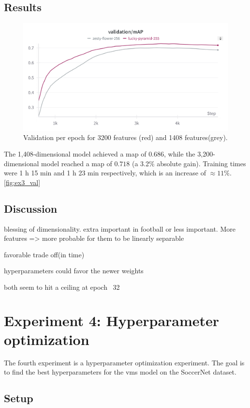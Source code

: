 \subsection{Results}
\label{ssec:ex3_results}

\begin{figure}
    \centering
    \includegraphics[width=0.75\linewidth]{figures/1408_3200_val.png}
    \caption{Validation per epoch for 3200 features (red) and 1408 features(grey). }
    \label{fig:ex3_val}
\end{figure}
The 1,408-dimensional model achieved a  \acrshort{map} of \(0.686\), while the 3,200-dimensional model reached a \acrshort{map} of \(0.718\) (a 3.2\% absolute gain). Training times were 1 h 15 min and 1 h 23 min respectively, which is an increase of \(\approx11\%\). \autoref{fig:ex3_val} 


\subsection{Discussion}
\label{ssec:ex3_discussion}

blessing of dimensionality. extra important in football or less important. More features => more probable for them to be linearly separable

favorable trade off(in time)

hyperparameters could favor the newer weights

both seem to hit a ceiling at epoch ~32


\section{Experiment 4: Hyperparameter optimization}
\label{sec:experiment4}

The fourth experiment is a hyperparameter optimization experiment.
The goal is to find the best hyperparameters for the \acrshort{vms} model on the SoccerNet dataset.

\subsection{Setup}
\label{ssec:ex4_setup}

